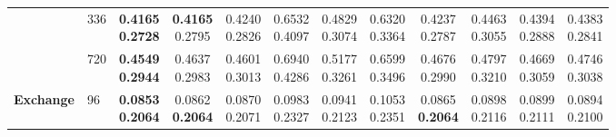 \begin{longtable}{@{}llcccccccccc@{}}
 & 336 & \shortstack{\colorbox[gray]{0.82}{\textbf{0.4165}}\\\colorbox[gray]{0.82}{\textbf{0.2728}}} & \shortstack{\colorbox[gray]{0.82}{\textbf{0.4165}}\\0.2795} & \shortstack{0.4240\\0.2826} & \shortstack{0.6532\\0.4097} & \shortstack{0.4829\\0.3074} & \shortstack{0.6320\\0.3364} & \shortstack{\colorbox[gray]{0.92}{0.4237}\\\colorbox[gray]{0.92}{0.2787}} & \shortstack{0.4463\\0.3055} & \shortstack{0.4394\\0.2888} & \shortstack{0.4383\\0.2841} \\ \cline{2-12}

 & 720 & \shortstack{\colorbox[gray]{0.82}{\textbf{0.4549}}\\\colorbox[gray]{0.82}{\textbf{0.2944}}} & \shortstack{0.4637\\\colorbox[gray]{0.92}{0.2983}} & \shortstack{\colorbox[gray]{0.92}{0.4601}\\0.3013} & \shortstack{0.6940\\0.4286} & \shortstack{0.5177\\0.3261} & \shortstack{0.6599\\0.3496} & \shortstack{0.4676\\0.2990} & \shortstack{0.4797\\0.3210} & \shortstack{0.4669\\0.3059} & \shortstack{0.4746\\0.3038} \\ \hline

\textbf{Exchange} & 96 & \shortstack{\colorbox[gray]{0.82}{\textbf{0.0853}}\\\colorbox[gray]{0.82}{\textbf{0.2064}}} & \shortstack{\colorbox[gray]{0.92}{0.0862}\\\colorbox[gray]{0.82}{\textbf{0.2064}}} & \shortstack{0.0870\\\colorbox[gray]{0.92}{0.2071}} & \shortstack{0.0983\\0.2327} & \shortstack{0.0941\\0.2123} & \shortstack{0.1053\\0.2351} & \shortstack{0.0865\\\colorbox[gray]{0.82}{\textbf{0.2064}}} & \shortstack{0.0898\\0.2116} & \shortstack{0.0899\\0.2111} & \shortstack{0.0894\\0.2100} \\ \cline{2-12}


\end{longtable}

